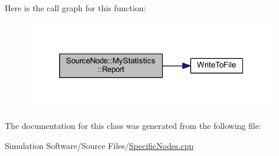 Here is the call graph for this function\+:\nopagebreak
\begin{figure}[H]
\begin{center}
\leavevmode
\includegraphics[width=313pt]{class_source_node_1_1_my_statistics_a39931b0ce449658de7d6be309dca8eee_cgraph}
\end{center}
\end{figure}


The documentation for this class was generated from the following file\+:\begin{DoxyCompactItemize}
\item 
Simulation Software/\+Source Files/\hyperlink{_specific_nodes_8cpp}{Specific\+Nodes.\+cpp}\end{DoxyCompactItemize}

